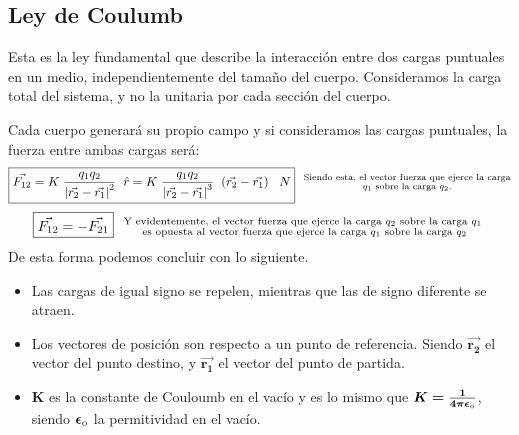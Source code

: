 \subsection{Ley de Coulumb}
\noindent Esta es la ley fundamental que describe la interacción entre dos cargas puntuales en un medio, independientemente del tamaño del cuerpo. Consideramos la carga total del sistema, y no la unitaria por cada sección del cuerpo. \par
\hspace{4cm}
 \par
\noindent Cada cuerpo generará su propio campo y si consideramos las cargas puntuales, la fuerza entre ambas cargas será:
\[
        \boxed{\vec{F_{12}} = K \hspace{1mm}\frac{q_1q_2}{\left | \vec{r_2} - \vec{r_1} \right |^2}\hspace{2mm}\hat{r} = K \hspace{1mm}\frac{q_1q_2}{\left | \vec{r_2} - \vec{r_1} \right |^3}\hspace{2mm}(\vec{r_2} - \vec{r_1}) \hspace{3mm}N} \hspace{.25cm}
        \substack{\textnormal{\scriptsize{Siendo esta, el vector fuerza que ejerce la carga}} \\
                \textnormal{\(q_1\) sobre la carga \(q_2\).}}
\]
\[
        \boxed{\vec{F_{12}} = -\vec{F_{21}}} \hspace{.25cm}
        \substack{
                \textnormal{\scriptsize{Y evidentemente, el vector fuerza que ejerce la carga \(q_2\) sobre la carga \(q_1\) }}\\
                \textnormal{\scriptsize{es opuesta al vector fuerza que ejerce la carga \(q_1\) sobre la carga \(q_2\)}}
        }
\]
\newline
De esta forma podemos concluir con lo siguiente.
\begin{itemize}
        \item Las cargas de igual signo se repelen, mientras que las de signo diferente se atraen.
        \item Los vectores de posición son respecto a un punto de referencia. Siendo \(\bm{\vec{r_2}}\) el vector del punto destino, y \(\bm{\vec{r_1}}\) el vector del punto de partida.
        \item \(\bm{K}\) es la constante de Couloumb en el vacío y es lo mismo que \(\bm{K = \frac{1}{4\pi\epsilon_{\textnormal{o}}}}\), siendo \(\bm{\epsilon_{\textnormal{o}}}\) la permitividad en el vacío.
\end{itemize}
